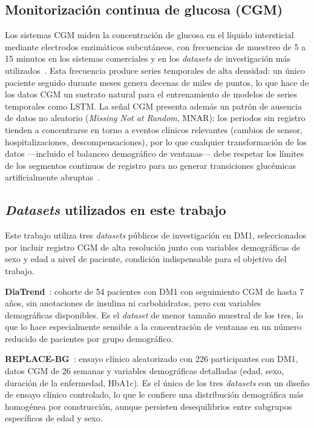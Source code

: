 \subsection{Monitorización continua de glucosa (CGM)}

Los sistemas CGM miden la concentración de glucosa en el líquido intersticial mediante electrodos enzimáticos subcutáneos, con frecuencias de muestreo de 5 a 15 minutos en los sistemas comerciales y en los \emph{datasets} de investigación más utilizados~\cite{klonoff2017cgm}. Esta frecuencia produce series temporales de alta densidad: un único paciente seguido durante meses genera decenas de miles de puntos, lo que hace de los datos CGM un sustrato natural para el entrenamiento de modelos de series temporales como LSTM. La señal CGM presenta además un patrón de ausencia de datos no aleatorio (\emph{Missing Not at Random}, MNAR): los periodos sin registro tienden a concentrarse en torno a eventos clínicos relevantes (cambios de sensor, hospitalizaciones, descompensaciones), por lo que cualquier transformación de los datos —incluido el balanceo demográfico de ventanas— debe respetar los límites de los segmentos continuos de registro para no generar transiciones glucémicas artificialmente abruptas~\cite{little2019statistical}.

\subsection{\emph{Datasets} utilizados en este trabajo}
\label{subsec:datasets_utilizados}

Este trabajo utiliza tres \emph{datasets} públicos de investigación en DM1, seleccionados por incluir registro CGM de alta resolución junto con variables demográficas de sexo y edad a nivel de paciente, condición indispensable para el objetivo del trabajo.

\textbf{DiaTrend}~\cite{sun2023diatrend}: cohorte de 54 pacientes con DM1 con seguimiento CGM de hasta 7 años, sin anotaciones de insulina ni carbohidratos, pero con variables demográficas disponibles. Es el \emph{dataset} de menor tamaño muestral de los tres, lo que lo hace especialmente sensible a la concentración de ventanas en un número reducido de pacientes por grupo demográfico.

\textbf{REPLACE-BG}~\cite{aleppo2017replace}: ensayo clínico aleatorizado con 226 participantes con DM1, datos CGM de 26 semanas y variables demográficas detalladas (edad, sexo, duración de la enfermedad, HbA1c). Es el único de los tres \emph{datasets} con un diseño de ensayo clínico controlado, lo que le confiere una distribución demográfica más homogénea por construcción, aunque persisten desequilibrios entre subgrupos específicos de edad y sexo.

